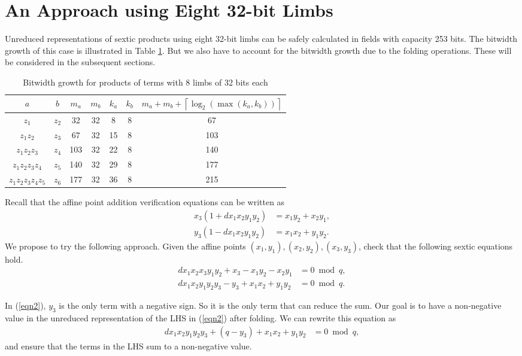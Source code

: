 \documentclass[a4paper, 12pt]{article}
\begin{document}
\section{An Approach using Eight 32-bit Limbs}%
\label{sec:an_approach_using_eight_32_bit_limbs}
Unreduced representations of sextic products using eight 32-bit limbs can be safely calculated in fields with capacity 253 bits. The bitwidth growth of this case is illustrated in Table \ref{tab:limb32}. But we also have to account for the bitwidth growth due to the folding operations. These will be considered in the subsequent sections.
\begin{table}[h]
  \centering
  \begin{tabular}{c|c|c|c|c|c|c}
    $a$ & $b$ & $m_a$ & $m_b$ & $k_a$ & $k_b$ & $m_a+m_b+\left\lceil \log_2 \left( \max\left( k_a, k_b \right) \right) \right\rceil$ \\ \hline
    $z_1$ & $z_2$ & 32 & 32 & 8 & 8 & 67 \\ \hline
    $z_1z_2$ & $z_3$ & 67 & 32 & 15 & 8 & 103 \\ \hline
    $z_1z_2z_3$ & $z_4$ & 103 & 32 & 22 & 8 & 140 \\ \hline
    $z_1z_2z_3z_4$ & $z_5$ & 140 & 32 & 29 & 8 & 177 \\ \hline
    $z_1z_2z_3z_4z_5$ & $z_6$ & 177 & 32 & 36 & 8 & 215 \\ \hline
  \end{tabular}
  \caption{Bitwidth growth for products of terms with 8 limbs of 32 bits each}
  \label{tab:limb32}
\end{table}

Recall that the affine point addition verification equations can be written as
\begin{align}
  x_3(1+dx_1x_2y_1y_2) &= x_1y_2 + x_2y_1,\\
  y_3(1-dx_1x_2y_1y_2) &= x_1x_2 + y_1y_2.
  \label{eqn:additionAffineVerificationLimbs8}
\end{align}
We propose to try the following approach. Given the affine points $(x_1, y_1), (x_2, y_2), (x_3, y_3)$, check that the following sextic equations hold.
\begin{align}
  dx_1x_2x_3y_1y_2 + x_3 - x_1y_2 - x_2y_1 &= 0 \bmod q,\label{eqn1}\\
  dx_1x_2y_1y_2y_3 - y_3 + x_1x_2 + y_1y_2 &= 0 \bmod q.\label{eqn2}
\end{align}

In (\ref{eqn2}), $y_3$ is the only term with a negative sign. So it is the only term that can reduce the sum. Our goal is to have a non-negative value in the unreduced representation of the LHS in (\ref{eqn2}) after folding. We can rewrite this equation as
\begin{align}
  dx_1x_2y_1y_2y_3 + (q - y_3) + x_1x_2 + y_1y_2 &= 0 \bmod q,\label{eqn3}
\end{align}
and ensure that the terms in the LHS sum to a non-negative value.
\end{document}
